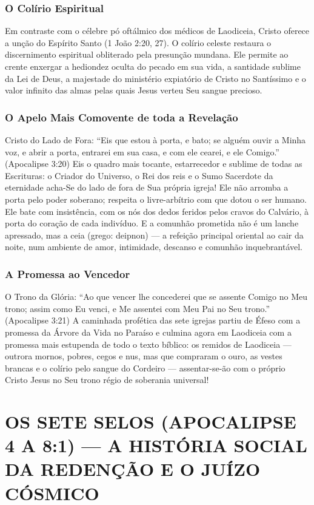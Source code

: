 \documentclass[11pt,a4paper,openany]{book}
\begin{document}
\subsubsection*{O Colírio Espiritual}
Em contraste com o célebre pó oftálmico dos médicos de Laodiceia, Cristo oferece a unção do Espírito Santo (1 João 2:20, 27). O colírio celeste restaura o discernimento espiritual obliterado pela presunção mundana. Ele permite ao crente enxergar a hediondez oculta do pecado em sua vida, a santidade sublime da Lei de Deus, a majestade do ministério expiatório de Cristo no Santíssimo e o valor infinito das almas pelas quais Jesus verteu Seu sangue precioso.


\subsubsection*{O Apelo Mais Comovente de toda a Revelação}
Cristo do Lado de Fora:
``Eis que estou à porta, e bato; se alguém ouvir a Minha voz, e abrir a porta, entrarei em sua casa, e com ele cearei, e ele Comigo.'' (Apocalipse 3:20)
Eis o quadro mais tocante, estarrecedor e sublime de todas as Escrituras: o Criador do Universo, o Rei dos reis e o Sumo Sacerdote da eternidade acha-Se do lado de fora de Sua própria igreja! Ele não arromba a porta pelo poder soberano; respeita o livre-arbítrio com que dotou o ser humano. Ele bate com insistência, com os nós dos dedos feridos pelos cravos do Calvário, à porta do coração de cada indivíduo. E a comunhão prometida não é um lanche apressado, mas a ceia (grego: deipnon) — a refeição principal oriental ao cair da noite, num ambiente de amor, intimidade, descanso e comunhão inquebrantável.


\subsubsection*{A Promessa ao Vencedor}
O Trono da Glória:
``Ao que vencer lhe concederei que se assente Comigo no Meu trono; assim como Eu venci, e Me assentei com Meu Pai no Seu trono.'' (Apocalipse 3:21)
A caminhada profética das sete igrejas partiu de Éfeso com a promessa da Árvore da Vida no Paraíso e culmina agora em Laodiceia com a promessa mais estupenda de todo o texto bíblico: os remidos de Laodiceia — outrora mornos, pobres, cegos e nus, mas que compraram o ouro, as vestes brancas e o colírio pelo sangue do Cordeiro — assentar-se-ão com o próprio Cristo Jesus no Seu trono régio de soberania universal!


\section{OS SETE SELOS (APOCALIPSE 4 A 8:1) — A HISTÓRIA SOCIAL DA REDENÇÃO E O JUÍZO CÓSMICO}
\end{document}
